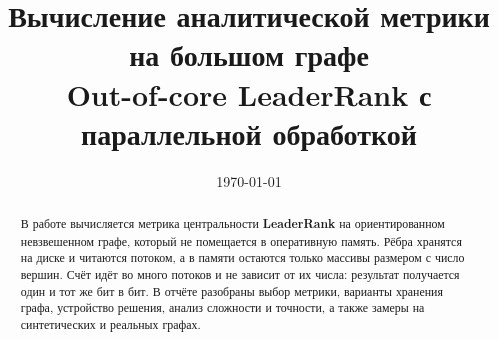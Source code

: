 \documentclass[12pt,a4paper]{article}
\title{Вычисление аналитической метрики на большом графе\\[2pt]
       \large Out-of-core LeaderRank с параллельной обработкой}
\author{} %
\date{\today}
\begin{document}
\maketitle
\begin{abstract}
\noindent
В работе вычисляется метрика центральности \textbf{LeaderRank} на ориентированном невзвешенном
графе, который не помещается в оперативную память. Рёбра хранятся на диске и читаются потоком, а в
памяти остаются только массивы размером с число вершин. Счёт идёт во много потоков и не зависит от
их числа: результат получается один и тот же бит в бит. В отчёте разобраны выбор метрики, варианты
хранения графа, устройство решения, анализ сложности и точности, а также замеры на синтетических и
реальных графах.
\end{abstract}
\medskip










\end{document}
